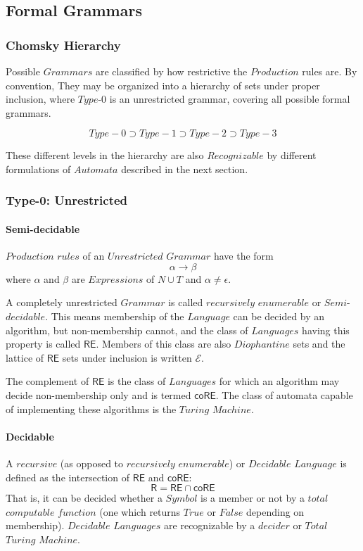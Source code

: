 \documentclass{article}
\begin{document}
\subsection{Formal Grammars}

\subsubsection{Chomsky Hierarchy}

Possible $Grammars$ are classified by how restrictive the $Production$
rules are. By convention, They may be organized into a hierarchy of
sets under proper inclusion, where $Type$-$0$ is an unrestricted
grammar, covering all possible formal grammars.

\[
    Type-0 \supset Type-1 \supset Type-2 \supset Type-3
\]

These different levels in the hierarchy are also $Recognizable$ by
different formulations of $Automata$ described in the next section.

\subsubsection{Type-0: Unrestricted}

\paragraph{Semi-decidable}
$Production$ $rules$ of an $Unrestricted$ $Grammar$ have the form
\[
    \alpha \rightarrow \beta
\]
where $\alpha$ and $\beta$ are $Expressions$ of $N \cup T$ and $\alpha
\neq \epsilon$.

A completely unrestricted $Grammar$ is called $recursively$
$enumerable$ or $Semi$-$decidable$. This means membership of the
$Language$ can be decided by an algorithm, but non-membership cannot,
and the class of $Languages$ having this property is called
$\mathsf{RE}$. Members of this class are also $Diophantine$ sets and
the lattice of $\mathsf{RE}$ sets under inclusion is written
$\mathcal{E}$.

The complement of $\mathsf{RE}$ is the class of $Languages$ for which
an algorithm may decide non-membership only and is termed
$\mathsf{coRE}$. The class of automata capable of implementing these
algorithms is the $Turing$ $Machine$.

\paragraph{Decidable}
A $recursive$ (as opposed to $recursively$ $enumerable$) or
$Decidable$ $Language$ is defined as the intersection of $\mathsf{RE}$
and $\mathsf{coRE}$:
\[
    \mathsf{R} = \mathsf{RE} \cap \mathsf{coRE}
\]
That is, it can be decided whether a $Symbol$ is a member or not by a
$total$ $computable$ $function$ (one which returns $True$ or $False$
depending on membership). $Decidable$ $Languages$ are recognizable by
a $decider$ or $Total$ $Turing$ $Machine$.
\end{document}
